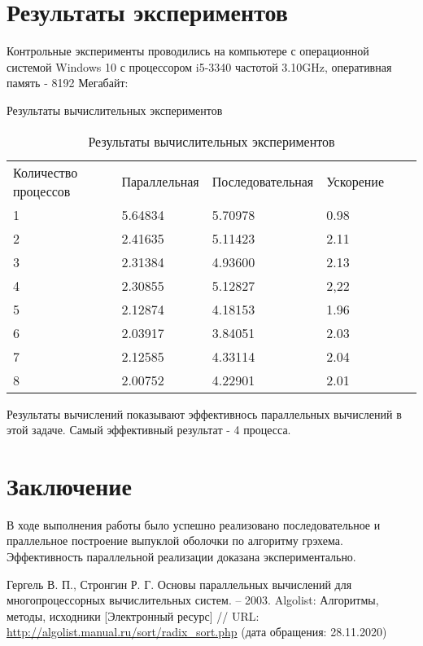 \documentclass{report}
\begin{document}
\section*{Результаты экспериментов}
Контрольные эксперименты проводились на компьютере с операционной системой Windows 10 с процессором i5-3340 частотой 3.10GHz, оперативная память - 8192 Мегабайт:
\begin{table}[!h]
\caption{Результаты вычислительных экспериментов}
\centering
\caption{Результаты вычислительных экспериментов}
\centering
\begin{tabular}{llllll}
Количество процессов & Параллельная & Последовательная & Ускорение  \\
1        & 5.64834        & 5.70978      & 0.98                     \\
2        & 2.41635        & 5.11423      & 2.11                     \\
3        & 2.31384        & 4.93600      & 2.13                     \\
4        & 2.30855        & 5.12827      & 2,22                     \\
5        & 2.12874        & 4.18153      & 1.96                     \\
6        & 2.03917        & 3.84051      & 2.03                     \\
7        & 2.12585        & 4.33114      & 2.04                     \\
8        & 2.00752        & 4.22901      & 2.01      
\end{tabular}
\end{table}

\par
Результаты вычислений показывают эффективнось параллельных вычислений в этой задаче. Самый эффективный результат - 4 процесса.
\newpage

\section*{Заключение}
В ходе выполнения работы было успешно реализовано последовательное и праллельное построение выпуклой оболочки по алгоритму грэхема. Эффективность параллельной реализации доказана экспериментально.
\newpage

\begin{thebibliography}{1}
Гергель В. П., Стронгин Р. Г. Основы параллельных вычислений для многопроцессорных вычислительных систем. – 2003.
 Algolist: Алгоритмы, методы, исходники [Электронный ресурс] // URL: \url {http://algolist.manual.ru/sort/radix_sort.php} (дата обращения: 28.11.2020)
\end{thebibliography}
\newpage
\end{document}
